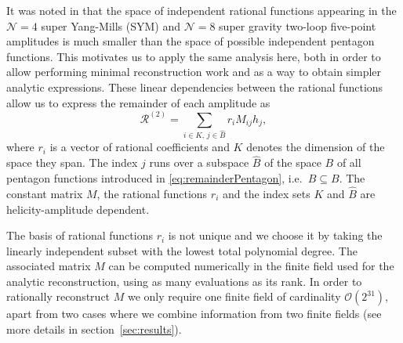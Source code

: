 It was noted in \cite{Abreu:2018aqd,Chicherin:2018yne,Abreu:2019rpt,Chicherin:2019xeg} 
that the space of independent rational
functions appearing in the $\mathcal{N}=4$ super Yang-Mills (SYM) and $\mathcal{N}=8$ super gravity
two-loop five-point amplitudes is much smaller than the space of possible independent
pentagon functions. This motivates us to apply the same analysis here, both
in order to allow performing minimal reconstruction work and as a way to obtain
simpler analytic expressions.
These linear dependencies between the rational functions allow us to express the 
remainder of each amplitude as
\begin{equation}
		\mathcal{R}^{(2)} = 
		\sum_{i\in K ,\, j\in \hat B} r_i M_{ij} h_j,
\label{eq:remainderDecomposition}
\end{equation}
where $r_i$ is a vector of rational coefficients and $K$ denotes
the dimension of the space they span.
The index $j$ runs over a subspace $\hat B$ of the space $B$ of all pentagon functions 
introduced in \cref{eq:remainderPentagon}, i.e.\  $\hat B\subseteq B$. 
The constant matrix $M$, the rational functions $r_i$ 
and the index sets $K$ and $\hat B$ are helicity-amplitude dependent.


The basis of rational functions $r_i$ is not unique
and we choose it by taking the linearly independent subset with
the lowest total polynomial degree. The associated matrix $M$
can be computed numerically in the finite field used for the analytic reconstruction,
using as many evaluations as its rank. 
In order to rationally reconstruct $M$ we only
require one finite field of cardinality $\mathcal{O}(2^{31})$, apart from two
cases where we combine information from two finite fields (see more details in 
section~\ref{sec:results}).

